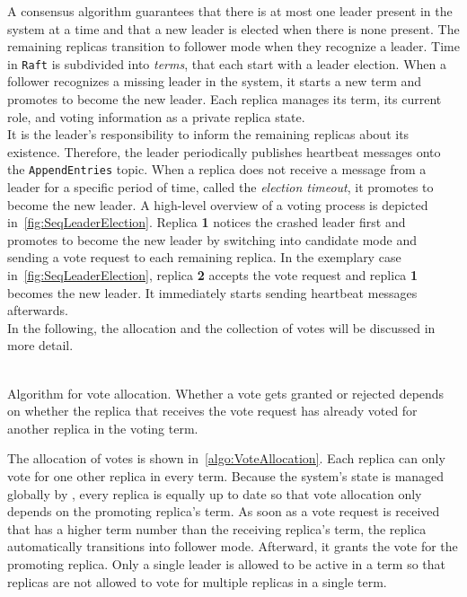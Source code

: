 A consensus algorithm guarantees that there is at most one leader present in the system at a time and that a new leader is elected when there is none present.
The remaining replicas transition to follower mode when they recognize a leader.
Time in \texttt{Raft} is subdivided into \textit{terms}, that each start with a leader election.
When a follower recognizes a missing leader in the system, it starts a new term and promotes to become the new leader. 
Each replica manages its term, its current role, and voting information as a private replica state.
\\

It is the leader's responsibility to inform the remaining replicas about its existence.
Therefore, the leader periodically publishes heartbeat messages onto the \texttt{AppendEntries} topic.
When a replica does not receive a message from a leader for a specific period of time, called the \textit{election timeout}, it promotes to become the new leader.
A high-level overview of a voting process is depicted in~\autoref{fig:SeqLeaderElection}.
Replica \textbf{1} notices the crashed leader first and promotes to become the new leader by switching into candidate mode and sending a vote request to each remaining replica.
In the exemplary case in~\autoref{fig:SeqLeaderElection}, replica \textbf{2} accepts the vote request and replica \textbf{1} becomes the new leader.
It immediately starts sending heartbeat messages afterwards.
\\
In the following, the allocation and the collection of votes will be discussed in more detail.
\\\\

\begin{algorithm}[H]
\caption{Algorithm for vote allocation. Whether a vote gets granted or rejected depends on whether the replica that receives the vote request has already voted for another replica in the voting term.}\label{algo:VoteAllocation}

\BlankLine
{}
\end{algorithm}

The allocation of votes is shown in~\autoref{algo:VoteAllocation}.
Each replica can only vote for one other replica in every term.
Because the system's state is managed globally by , every replica is equally up to date so that vote allocation only depends on the promoting replica's term.
As soon as a vote request is received that has a higher term number than the receiving replica's term, the replica automatically transitions into follower mode.
Afterward, it grants the vote for the promoting replica.
Only a single leader is allowed to be active in a term so that replicas are not allowed to vote for multiple replicas in a single term.
\\


